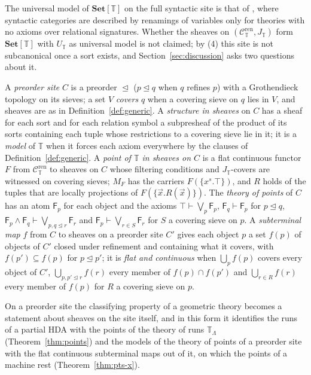 \documentclass{lmcs}
\theoremstyle{definition}
\theoremstyle{remark}
\newcommand{\Tt}{\mathbb{T}}
\newcommand{\Set}{\mathbf{Set}}
\newcommand{\Der}{\vdash}
\newcommand{\TR}{\Tt_{\Lambda}}
\newcommand{\Csyn}[1]{\mathcal{C}^{\mathrm{ren}}_{#1}}
\newcommand{\Jsyn}[1]{J_{#1}}
\newcommand{\Clf}[1]{\Set[#1]}
\newcommand{\MF}[1]{M_{#1}}
\newcommand{\ext}{\trianglelefteq}
\newcommand{\fat}[1]{\mathsf{F}_{#1}}
\begin{document}
The universal model of $\Clf{\Tt}$ on the full syntactic site is that of
\cite{CL25a}, where syntactic categories are described by
renamings of variables only for theories with no axioms over relational
signatures. Whether the sheaves on
$(\Csyn{\Tt},\Jsyn{\Tt})$ form $\Clf{\Tt}$ with $U_{\Tt}$ as universal model is not claimed; by (4) this site is not
subcanonical once a sort exists, and Section~\ref{sec:discussion} asks two questions about it.

A \emph{preorder site} $C$ is a preorder $\ext$ ($p\ext q$ when $q$ refines $p$) with a Grothendieck topology
on its sieves; a set $V$ \emph{covers} $q$ when a covering sieve on $q$ lies in $V$, and sheaves are as in
Definition~\ref{def:generic}. A \emph{structure in sheaves} on $C$ has a sheaf for each sort and for each relation
symbol a subpresheaf of the product of its sorts containing each tuple whose restrictions to a covering sieve lie
in it; it is a \emph{model} of $\Tt$ when it forces each axiom everywhere by the clauses of
Definition~\ref{def:generic}. A \emph{point of $\Tt$ in sheaves on $C$} is a flat continuous functor $F$ from
$\Csyn{\Tt}$ to sheaves on $C$ whose filtering conditions and $\Jsyn{\Tt}$-covers are witnessed on covering sieves;
$\MF{F}$ has the carriers $F(\{x^s.\top\})$, and $R$ holds of the tuples that are locally projections of
$F(\{\vec x.R(\vec x)\})$.
The \emph{theory of points} of $C$ has an atom $\fat{p}$ for each object and the axioms
$\top\Der\bigvee_p\fat{p}$, $\fat{q}\Der\fat{p}$ for $p\ext q$, $\fat{p}\wedge\fat{q}\Der\bigvee_{p,q\ext r}\fat{r}$
and $\fat{p}\Der\bigvee_{r\in S}\fat{r}$ for $S$ a covering sieve on
$p$. A \emph{subterminal map} $f$ from $C$ to sheaves on a
preorder site $C'$ gives each object $p$ a set $f(p)$ of objects of $C'$ closed under refinement and containing what
it covers, with $f(p')\subseteq f(p)$ for $p\ext p'$; it is \emph{flat and continuous} when $\bigcup_p f(p)$ covers
every object of $C'$, $\bigcup_{p,p'\ext r}f(r)$ every member of $f(p)\cap f(p')$ and $\bigcup_{r\in R}f(r)$ every
member of $f(p)$ for $R$ a covering sieve on $p$.

On a preorder site the classifying property of a geometric theory becomes a statement about sheaves on the site
itself, and in this form it identifies the runs of a partial HDA with the points of the theory of runs $\TR$
(Theorem~\ref{thm:points}) and the models of the theory of points of a preorder site with the flat continuous
subterminal maps out of it, on which the points of a machine rest (Theorem~\ref{thm:pts-x}).
\end{document}
